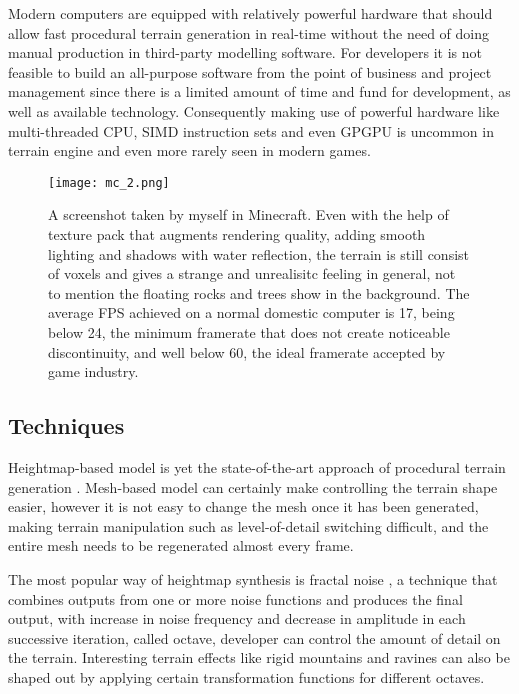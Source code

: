 \documentclass[oneside, a4paper]{article}
\begin{document}
    Modern computers are equipped with relatively powerful hardware that should allow fast procedural terrain generation in real-time without the need of doing manual production in third-party modelling software. For developers it is not feasible to build an all-purpose software from the point of business and project management since there is a limited amount of time and fund for development, as well as available technology. Consequently making use of powerful hardware like multi-threaded CPU, SIMD instruction sets and even GPGPU is uncommon in terrain engine and even more rarely seen in modern games.

    \begin{figure}[H]
        \texttt{[image: mc\_2.png]}
        \caption{A screenshot taken by myself in Minecraft. Even with the help of texture pack that augments rendering quality, adding smooth lighting and shadows with water reflection, the terrain is still consist of voxels and gives a strange and unrealisitc feeling in general, not to mention the floating rocks and trees show in the background. The average FPS achieved on a normal domestic computer is 17, being below 24, the minimum framerate that does not create noticeable discontinuity, and well below 60, the ideal framerate accepted by game industry.}
    \end{figure}

    \subsection{Techniques}

    Heightmap-based model is yet the state-of-the-art approach of procedural terrain generation \cite{kang_sim_han_2018}. Mesh-based model can certainly make controlling the terrain shape easier, however it is not easy to change the mesh once it has been generated, making terrain manipulation such as level-of-detail switching difficult, and the entire mesh needs to be regenerated almost every frame.

    The most popular way of heightmap synthesis is fractal noise \cite{texturing_modeling}, a technique that combines outputs from one or more noise functions and produces the final output, with increase in noise frequency and decrease in amplitude in each successive iteration, called octave, developer can control the amount of detail on the terrain. Interesting terrain effects like rigid mountains and ravines can also be shaped out by applying certain transformation functions for different octaves.
    
\end{document}
